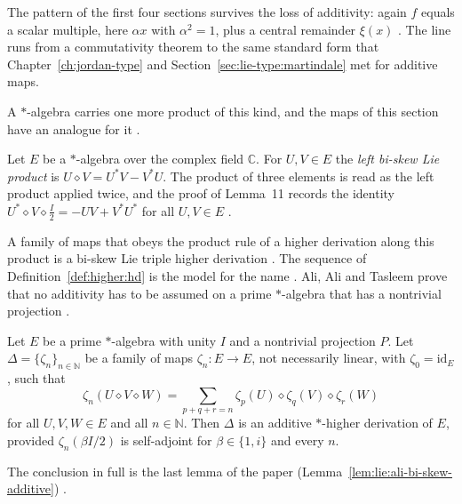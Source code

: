 The pattern of the first four sections survives the loss of additivity:
again $f$ equals a scalar multiple, here $\alpha x$ with $\alpha^{2}=1$,
plus a central remainder $\xi(x)$ \cite[p.~733]{BaiDu2014}. The line runs
from a commutativity theorem to the same standard form that
Chapter~\ref{ch:jordan-type} and
Section~\ref{sec:lie-type:martindale} met for additive maps.

A $*$-algebra carries one more product of this kind, and the maps of this
section have an analogue for it \cite[p.~127]{AliAliTasleem2026}.

\begin{definition}\label{def:lie:bi-skew-product}
Let $E$ be a $*$-algebra over the complex field $\mathbb{C}$. For $U,V\in E$
the \emph{left bi-skew Lie product} is $U\diamond V=U^{*}V-V^{*}U$. The product
of three elements is read as the left product applied twice, and the proof of
Lemma~11 records the identity
$U^{*}\diamond V\diamond\tfrac{I}{2}=-UV+V^{*}U^{*}$ for all $U,V\in E$
\cite[p.~136]{AliAliTasleem2026}.
\end{definition}

A family of maps that obeys the product rule of a higher derivation along this
product is a bi-skew Lie triple higher derivation
\cite[p.~128]{AliAliTasleem2026}. The sequence of
Definition~\ref{def:higher:hd} is the model for the name
\cite[p.~128]{AliAliTasleem2026}. Ali, Ali and Tasleem prove that no additivity
has to be assumed on a prime $*$-algebra that has a nontrivial projection
\cite[Main Theorem, p.~128]{AliAliTasleem2026}.

\begin{theorem}\label{thm:lie:ali-bi-skew-triple}
Let $E$ be a prime $*$-algebra with unity $I$ and a nontrivial projection $P$.
Let $\Delta=\{\zeta_{n}\}_{n\in\mathbb{N}}$ be a family of maps
$\zeta_{n}\colon E\to E$, not necessarily linear, with
$\zeta_{0}=\mathrm{id}_{E}$, such that
\[
\zeta_{n}(U\diamond V\diamond W)
=\sum_{p+q+r=n}\zeta_{p}(U)\diamond\zeta_{q}(V)\diamond\zeta_{r}(W)
\]
for all $U,V,W\in E$ and all $n\in\mathbb{N}$. Then $\Delta$ is an additive
$*$-higher derivation of $E$, provided $\zeta_{n}(\beta I/2)$ is self-adjoint
for $\beta\in\{1,i\}$ and every $n$.
\end{theorem}

The conclusion in full is the last lemma of the paper (Lemma~\ref{lem:lie:ali-bi-skew-additive}) \cite[p.~136]{AliAliTasleem2026}.

